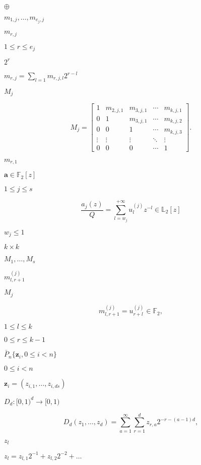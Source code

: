 \documentclass{article}
\begin{document}
$\oplus$
\pagebreak

$m_{1,j}, \dots, m_{e_j,j}$
\pagebreak

$m_{r,j}$
\pagebreak

$ 1 \leq r \leq e_j$
\pagebreak

$2^r$
\pagebreak

$m_{r,j} = \sum_{l = 1} m_{r,j,l} 2^{r-l} $
\pagebreak

$M_{j}$
\pagebreak

\[M_{j} = 
  \begin{bmatrix}
    1 & m_{2,j,1} & m_{3,j,1} & \cdots & m_{k,j,1} \\
    0 & 1 & m_{3,j,1} & \cdots & m_{k,j,2} \\
    0 & 0 & 1 & \cdots & m_{k,j,3} \\
    \vdots & \vdots & \vdots & \ddots & \vdots \\
    0 & 0 & 0 & \cdots & 1
  \end{bmatrix}.
\]
\pagebreak

$m_{r,1}$
\pagebreak

$\boldsymbol a \in \mathbb F_2[z]$
\pagebreak

$ 1 \leq j \leq s $
\pagebreak

\[\frac{a_j(z)}{Q} = \sum_{l = w_j}^{+\infty} u_{l}^{(j)} z^{-l} \in \mathbb L_2[z]
\]
\pagebreak

$ w_{j} \leq 1 $
\pagebreak

$k \times k$
\pagebreak

$M_{1}, \dots, M_s $
\pagebreak

$m_{l, r + 1}^{(j)}$
\pagebreak

$M_j$
\pagebreak

\[m_{l, r + 1}^{(j)} = u_{r+l}^{(j)} \in \mathbb F_2,
\]
\pagebreak

$ 1 \leq l \leq k$
\pagebreak

$0 \leq r \leq k - 1 $
\pagebreak

$\bar{P}_n \{\boldsymbol z_i, 0 \leq i < n \}$
\pagebreak

$ 0 \leq i < n$
\pagebreak

$\boldsymbol z_i = (z_{i,1}, \dots, z_{i,ds})$
\pagebreak

$D_d: [0,1)^d \rightarrow [0,1)$
\pagebreak

\[D_d(z_1, \dots, z_d) = \sum_{a = 1}^{\infty} \sum_{r = 1}^d z_{r,a} 2^{-r-(a-1)d},
\]
\pagebreak

$z_l$
\pagebreak

$z_l = z_{l,1} 2^{-1} + z_{l,2} 2^{-2} + \dots$
\pagebreak
\end{document}
